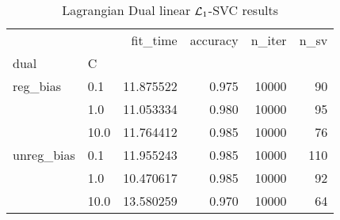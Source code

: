 \begin{table}[H]
\centering
\caption{Lagrangian Dual linear $\protect \mathcal{L}_1$-SVC results}
\label{linear_lagrangian_dual_l1_svc_cv_results}
\begin{tabular}{llrrrr}
\toprule
           &      &   fit\_time &  accuracy &  n\_iter &  n\_sv \\
dual & C &            &           &         &       \\
\midrule
reg\_bias & 0.1  &  11.875522 &     0.975 &   10000 &    90 \\
           & 1.0  &  11.053334 &     0.980 &   10000 &    95 \\
           & 10.0 &  11.764412 &     0.985 &   10000 &    76 \\
unreg\_bias & 0.1  &  11.955243 &     0.985 &   10000 &   110 \\
           & 1.0  &  10.470617 &     0.985 &   10000 &    92 \\
           & 10.0 &  13.580259 &     0.970 &   10000 &    64 \\
\bottomrule
\end{tabular}
\end{table}
